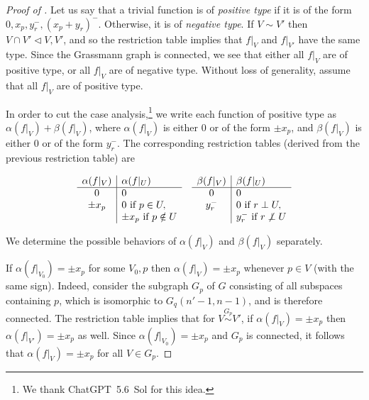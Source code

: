 \documentclass[10pt,a4paper]{amsart}
\providecommand{\subs}{\triangleleft}
\begin{document}
\begin{proof}[Proof of ]

Let us say that a trivial function is of \emph{positive type} if it is of the form $0,x_p,y_r^-,(x_p+y_r)^-$. Otherwise, it is of \emph{negative type}. If $V \sim V'$ then $V \cap V' \subs V,V'$, and so the restriction table implies that $f|_V$ and $f|_{V'}$ have the same type. Since the Grassmann graph is connected, we see that either all $f|_V$ are of positive type, or all $f|_V$ are of negative type. Without loss of generality, assume that all $f|_V$ are of positive type.

In order to cut the case analysis,\footnote{We thank ChatGPT~5.6~Sol for this idea.} we write each function of positive type as $\alpha(f|_V) + \beta(f|_V)$, where $\alpha(f|_V)$ is either $0$ or of the form $\pm x_p$, and $\beta(f|_V)$ is either $0$ or of the form $y_r^-$. The corresponding restriction tables (derived from the previous restriction table) are

\[
\begin{array}[t]{c|l}
\alpha(f|_V) & \alpha(f|_U) \\\hline
0 & 0 \\
\pm x_p & 0 \text{ if } p \in U, \\ & \pm x_p \text{ if } p \notin U
\end{array}
\quad
\begin{array}[t]{c|l}
\beta(f|_V) & \beta(f|_U) \\\hline
0 & 0 \\
y_r^- & 0 \text{ if } r \perp U, \\ & y_r^- \text{ if } r \not\perp U
\end{array}
\]

We determine the possible behaviors of $\alpha(f|_V)$ and $\beta(f|_V)$ separately.

If $\alpha(f|_{V_0}) = \pm x_p$ for some $V_0,p$ then $\alpha(f|_V) = \pm x_p$ whenever $p \in V$ (with the same sign).
Indeed, consider the subgraph $G_p$ of $G$ consisting of all subspaces containing $p$, which is isomorphic to $G_q(n'-1,n-1)$, and is therefore connected. The restriction table implies that for $V \stackrel{G_p}\sim V'$, if $\alpha(f|_V) = \pm x_p$ then $\alpha(f|_{V'}) = \pm x_p$ as well. Since $\alpha(f|_{V_0}) = \pm x_p$ and $G_p$ is connected, it follows that $\alpha(f|_V) = \pm x_p$ for all $V \in G_p$.


\end{proof}
\end{document}
